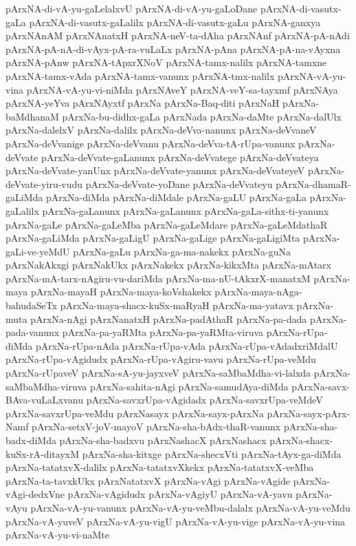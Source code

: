 {pArxNA-di-vA-yu-gaLelalxvU
pArxNA-di-vA-yu-gaLoDane
pArxNA-di-vasutx-gaLa
pArxNA-di-vasutx-gaLalilx
pArxNA-di-vasutx-gaLu
pArxNA-ganxya
pArxNAnAM
pArxNAnatxH
pArxNA-neV-ta-dAha
pArxNAnf
pArxNA-pA-nAdi
pArxNA-pA-nA-di-vAyx-pA-ra-vuLaLx
pArxNA-pAna
pArxNA-pA-na-vAyxna
pArxNA-pAnw
pArxNA-tApxrXNoV
pArxNA-tamx-nalilx
pArxNA-tamxne
pArxNA-tamx-vAda
pArxNA-tamx-vanunx
pArxNA-tmx-nalilx
pArxNA-vA-yu-vina
pArxNA-vA-yu-vi-niMda
pArxNAveY
pArxNA-veY-sa-tayxmf
pArxNAya
pArxNA-yeYva
pArxNAyxtf
pArxNa
pArxNa-Baq-diti
pArxNaH
pArxNa-baMdhanaM
pArxNa-bu-didhx-gaLa
pArxNada
pArxNa-daMte
pArxNa-dalUlx
pArxNa-dalelxV
pArxNa-dalilx
pArxNa-deVva-nanunx
pArxNa-deVvaneV
pArxNa-deVvanige
pArxNa-deVvanu
pArxNa-deVva-tA-rUpa-vanunx
pArxNa-deVvate
pArxNa-deVvate-gaLanunx
pArxNa-deVvatege
pArxNa-deVvateya
pArxNa-deVvate-yanUnx
pArxNa-deVvate-yanunx
pArxNa-deVvateyeV
pArxNa-deVvate-yiru-vudu
pArxNa-deVvate-yoDane
pArxNa-deVvateyu
pArxNa-dhamaR-gaLiMda
pArxNa-diMda
pArxNa-diMdale
pArxNa-gaLU
pArxNa-gaLa
pArxNa-gaLalilx
pArxNa-gaLanunx
pArxNa-gaLanunx
pArxNa-gaLa-sithx-ti-yanunx
pArxNa-gaLe
pArxNa-gaLeMba
pArxNa-gaLeMdare
pArxNa-gaLeMdathaR
pArxNa-gaLiMda
pArxNa-gaLigU
pArxNa-gaLige
pArxNa-gaLigiMta
pArxNa-gaLi-ve-yeMdU
pArxNa-gaLu
pArxNa-ga-ma-nakekx
pArxNa-guNa
pArxNakAkxgi
pArxNakUkx
pArxNakekx
pArxNa-kikxMta
pArxNa-mAtarx
pArxNa-mA-tarx-nAgiru-vu-dariMda
pArxNa-ma-nU-tAkxrX-manatxM
pArxNa-maya
pArxNa-mayaH
pArxNa-maya-koVshakekx
pArxNa-maya-nAga-bahudaSeTx
pArxNa-maya-shacx-kuSx-maRyaH
pArxNa-ma-yatavx
pArxNa-muta
pArxNa-nAgi
pArxNanatxH
pArxNa-padAthaR
pArxNa-pa-dada
pArxNa-pada-vanunx
pArxNa-pa-yaRMta
pArxNa-pa-yaRMta-viruva
pArxNa-rUpa-diMda
pArxNa-rUpa-nAda
pArxNa-rUpa-vAda
pArxNa-rUpa-vAdadxriMdalU
pArxNa-rUpa-vAgidudx
pArxNa-rUpa-vAgiru-vavu
pArxNa-rUpa-veMdu
pArxNa-rUpaveV
pArxNa-sA-yu-jayxveV
pArxNa-saMbaMdha-vi-lalxda
pArxNa-saMbaMdha-viruva
pArxNa-sahita-nAgi
pArxNa-samudAya-diMda
pArxNa-savx-BAva-vuLaLxvanu
pArxNa-savxrUpa-vAgidadx
pArxNa-savxrUpa-veMdeV
pArxNa-savxrUpa-veMdu
pArxNasayx
pArxNa-sayx-pArxNa
pArxNa-sayx-pArx-Namf
pArxNa-setxV-joV-mayoV
pArxNa-sha-bAdx-thaR-vanunx
pArxNa-sha-badx-diMda
pArxNa-sha-badxvu
pArxNashacX
pArxNashacx
pArxNa-shacx-kuSx-rA-ditayxM
pArxNa-sha-kitxge
pArxNa-shecxVti
pArxNa-tAyx-ga-diMda
pArxNa-tatatxvX-dalilx
pArxNa-tatatxvXkekx
pArxNa-tatatxvX-veMba
pArxNa-ta-tavxkUkx
pArxNatatxvX
pArxNa-vAgi
pArxNa-vAgide
pArxNa-vAgi-dedxVne
pArxNa-vAgidudx
pArxNa-vAgiyU
pArxNa-vA-yavu
pArxNa-vAyu
pArxNa-vA-yu-vanunx
pArxNa-vA-yu-veMbu-dalalx
pArxNa-vA-yu-veMdu
pArxNa-vA-yuveV
pArxNa-vA-yu-vigU
pArxNa-vA-yu-vige
pArxNa-vA-yu-vina
pArxNa-vA-yu-vi-naMte
}
